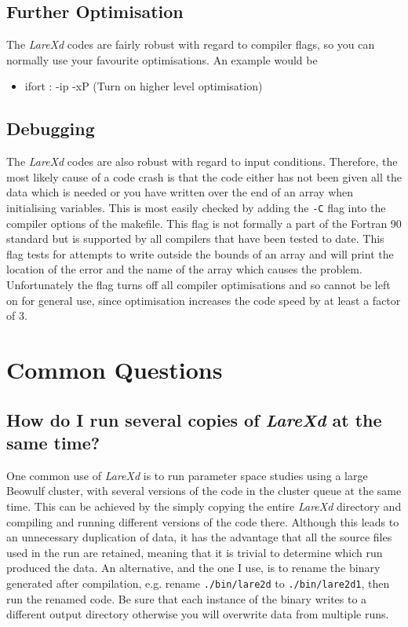 \documentclass[11pt]{article}
\begin{document}
\subsection{Further Optimisation}
The {\it LareXd} codes are fairly robust with regard to compiler flags, so you can normally use your favourite optimisations. 
An example would be
\begin{itemize}
\item ifort : -ip -xP (Turn on higher level optimisation)
\end{itemize}
\subsection{Debugging}
The {\it LareXd} codes are also robust with regard to input conditions. Therefore, the most likely cause of a code crash 
is that the code either has not been given all the data which is needed or you have written over the end of an array 
when initialising variables. This is most easily checked by adding the \texttt{-C} flag into the compiler options of the 
makefile. This flag is not formally a part of the Fortran 90 standard but is supported by all compilers that have been 
tested to date. This flag tests for attempts to write outside the bounds of an array and will print the location of the 
error and the name of the array which causes the problem. Unfortunately the flag turns off all compiler optimisations 
and so cannot be left on for general use, since optimisation increases the code speed by at least a factor of 3.

\section{Common Questions}
\subsection*{How do I run several copies of {\it LareXd} at the same time?}
One common use of {\it LareXd} is to run parameter space studies using a large
Beowulf cluster, with several versions of the code in the cluster queue at the
same time. This can be achieved by the simply copying the entire {\it
  LareXd} directory and compiling and running different versions of the code
there. Although this leads to an unnecessary duplication of data, it has the
advantage that all the source files used in the run are retained, meaning that
it is trivial to determine which run produced the data. An alternative, and the one I use, is to rename the binary 
generated after compilation, e.g. rename {\tt ./bin/lare2d} to {\tt ./bin/lare2d1}, then run the renamed code. 
Be sure that each instance of the binary writes to a different output directory otherwise you will overwrite 
data from multiple runs.
\end{document}
